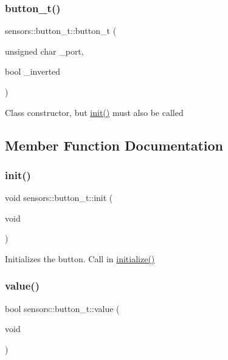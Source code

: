 \subsubsection{\texorpdfstring{button\+\_\+t()}{button\_t()}}
{\footnotesize\ttfamily sensors\+::button\+\_\+t\+::button\+\_\+t (\begin{DoxyParamCaption}\item[{unsigned char}]{\+\_\+port,  }\item[{bool}]{\+\_\+inverted }\end{DoxyParamCaption})}

Class constructor, but \hyperlink{structsensors_1_1button__t_a1b5fc93672ca08665b8d8c6664131d1f}{init()} must also be called 

\subsection{Member Function Documentation}
\mbox{\label{structsensors_1_1button__t_a1b5fc93672ca08665b8d8c6664131d1f}} 
\subsubsection{\texorpdfstring{init()}{init()}}
{\footnotesize\ttfamily void sensors\+::button\+\_\+t\+::init (\begin{DoxyParamCaption}\item[{void}]{ }\end{DoxyParamCaption})}

Initializes the button. Call in \hyperlink{main_8h_a25a40b6614565f755233080a384c35f1}{initialize()} \mbox{\label{structsensors_1_1button__t_a3a8a49bbe489984f30f78d53ba5a1372}} 
\subsubsection{\texorpdfstring{value()}{value()}}
{\footnotesize\ttfamily bool sensors\+::button\+\_\+t\+::value (\begin{DoxyParamCaption}\item[{void}]{ }\end{DoxyParamCaption})}

